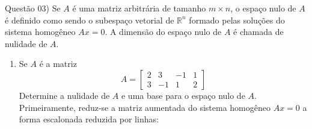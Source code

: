 
\noindent \textcolor{COLOR1}{Questão 03)} Se $A$ é uma matriz arbitrária de tamanho $m\times n$, o espaço nulo de $A$ é definido como sendo o subespaço vetorial de $\mathbb{R}^n$ formado pelas soluções do sistema homogêneo $Ax = 0$. A dimensão do espaço nulo de $A$ é chamada de nulidade de $A.$
\\

\begin{enumerate}
    \item Se $A$ é a matriz
          \[A=
              \begin{bmatrix}
                  2 & 3  & -1 & 1 \\
                  3 & -1 & 1  & 2
              \end{bmatrix}
          \]
          Determine a nulidade de $A$ e uma base para o espaço nulo de $A$.
          \\

          Primeiramente, reduz-se a matriz aumentada do sistema homogêneo $Ax = 0$ a forma escalonada reduzida por linhas:
          \\


\end{enumerate}
